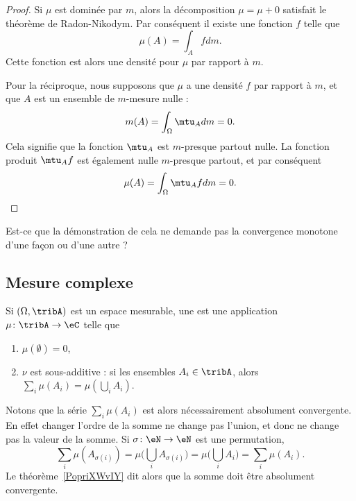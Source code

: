 \begin{proof}
	Si \( \mu\) est dominée par \( m\), alors la décomposition \( \mu=\mu+0\) satisfait le théorème de Radon-Nikodym. Par conséquent il existe une fonction \( f\) telle que
	\begin{equation}
		\mu(A)=\int_Afdm.
	\end{equation}
	Cette fonction est alors une densité pour \( \mu\) par rapport à \( m\).

	Pour la réciproque, nous supposons que \( \mu\) a une densité \( f\) par rapport à \( m\), et que \( A\) est un ensemble de \( m\)-mesure nulle :
	\begin{equation}
		m(A)=\int_{\Omega}\mtu_Adm=0.
	\end{equation}
	Cela signifie que la fonction \( \mtu_A\) est \( m\)-presque partout nulle. La fonction produit \( \mtu_Af\) est également nulle \( m\)-presque partout, et par conséquent
	\begin{equation}
		\mu(A)=\int_{\Omega}\mtu_Afdm=0.
	\end{equation}
\end{proof}

\begin{probleme}
	Est-ce que la démonstration de cela ne demande pas la convergence monotone d'une façon ou d'une autre ?
\end{probleme}

\subsection{Mesure complexe}

\begin{definition} \label{DefGKHLooYjocEt}
	Si \( (\Omega,\tribA)\) est un espace mesurable, une  est une application \( \mu\colon \tribA\to \eC\) telle que
	\begin{enumerate}
		\item
		      \( \mu(\emptyset)=0\),
		\item
		      \( \nu\) est sous-additive : si les ensembles \( A_i\in\tribA\), alors \( \sum_i\mu(A_i)=\mu(\bigcup_iA_i)\).
	\end{enumerate}
\end{definition}
Notons que la série \( \sum_i\mu(A_i)\) est alors nécessairement absolument convergente. En effet changer l'ordre de la somme ne change pas l'union, et donc ne change pas la valeur de la somme. Si \( \sigma\colon \eN\to \eN\) est une permutation,
\begin{equation}
	\sum_i\mu(A_{\sigma(i)})=\mu\big( \bigcup_iA_{\sigma(i)} \big)=\mu\big( \bigcup_iA_i \big)=\sum_i\mu(A_i).
\end{equation}
Le théorème~\ref{PopriXWvIY} dit alors que la somme doit être absolument convergente.


